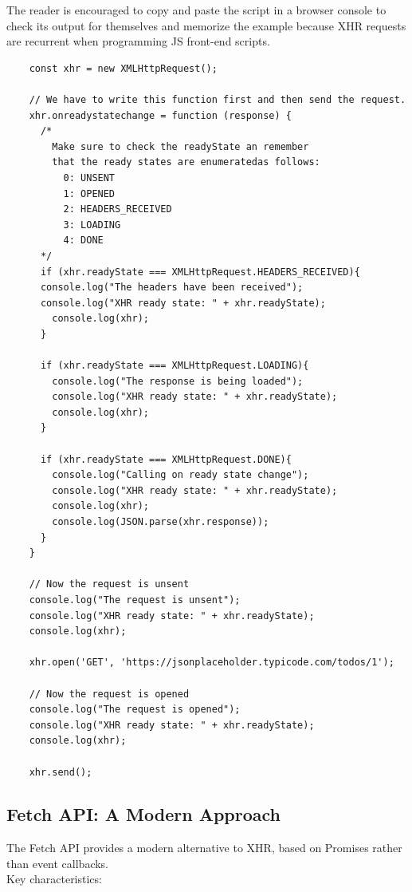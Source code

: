 \documentclass{scrbook}
\begin{document}
	The reader is encouraged to copy and paste the script in a browser console to check its output for themselves and memorize the example because XHR requests are recurrent when programming JS front-end scripts.
	
	\begin{lstlisting}
	const xhr = new XMLHttpRequest();
		
	// We have to write this function first and then send the request.
	xhr.onreadystatechange = function (response) {
	  /*
		Make sure to check the readyState an remember
		that the ready states are enumeratedas follows:
		  0: UNSENT
		  1: OPENED
		  2: HEADERS_RECEIVED
		  3: LOADING
		  4: DONE
	  */
	  if (xhr.readyState === XMLHttpRequest.HEADERS_RECEIVED){
	  console.log("The headers have been received");
	  console.log("XHR ready state: " + xhr.readyState);
		console.log(xhr);
	  }
			
	  if (xhr.readyState === XMLHttpRequest.LOADING){
		console.log("The response is being loaded");
		console.log("XHR ready state: " + xhr.readyState);
		console.log(xhr);
	  }
			
	  if (xhr.readyState === XMLHttpRequest.DONE){
		console.log("Calling on ready state change");
		console.log("XHR ready state: " + xhr.readyState);
		console.log(xhr);
		console.log(JSON.parse(xhr.response));
	  }
	}
		
	// Now the request is unsent
	console.log("The request is unsent");
	console.log("XHR ready state: " + xhr.readyState);
	console.log(xhr);
		
	xhr.open('GET', 'https://jsonplaceholder.typicode.com/todos/1');
		
	// Now the request is opened
	console.log("The request is opened");
	console.log("XHR ready state: " + xhr.readyState);
	console.log(xhr);
		
	xhr.send();
	\end{lstlisting}
	
	\subsection{Fetch API: A Modern Approach}
	
	The Fetch API provides a modern alternative to XHR, based on Promises rather than event callbacks.\\
	
	Key characteristics:
	
\end{document}
